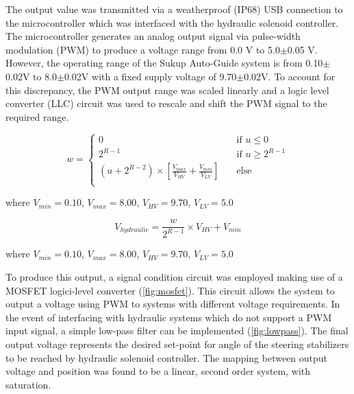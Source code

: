 \documentclass[authoryear]{elsarticle}
\begin{document}
The output value was transmitted via a weatherproof (IP68) USB
connection to the microcontroller which was interfaced with the
hydraulic solenoid controller. The microcontroller generates an analog
output signal via pulse-width modulation (PWM) to produce a voltage
range from 0.0 V to 5.0$\pm$0.05 V. However, the operating range of the
Sukup Auto-Guide system is from 0.10$\pm$0.02V to 8.0$\pm$0.02V with a fixed
supply voltage of 9.70$\pm$0.02V. To account for this discrepancy, the PWM
output range was scaled linearly and a logic level converter (LLC)
circuit was used to rescale and shift the PWM signal to the required
range.

\begin{equation}
  w = 
  \begin{cases}
    0 & \quad \text{if } u \leq 0 \\
    2^{R-1} & \quad \text{if } u \geq 2^{R-1}\\
    (u +2^{R-2})\times\left[\frac{V_{max}}{V_{HV}}+\frac{V_{min}}{V_{LV}}\right] & \quad \text{else} \\
  \end{cases}
  \label{eq:v_out}
\end{equation}
\begin{flushleft}
where $V_{min}=0.10$, $V_{max}=8.00$, $V_{HV}=9.70$, $V_{LV}=5.0$
\end{flushleft}

\begin{equation}
  V_{hydraulic} = \frac{w}{2^{R-1}} \times V_{HV} + V_{min}
  \label{eq:v_out}
\end{equation}
\begin{flushleft}
where $V_{min}=0.10$, $V_{max}=8.00$, $V_{HV}=9.70$, $V_{LV}=5.0$
\end{flushleft}

To produce this output, a signal condition circuit was employed making
use of a MOSFET logici-level converter (\ref{fig:mosfet}). This
circuit allows the system to output a voltage using PWM to systems with different voltage
requirements. In the event of interfacing with hydraulic systems which
do not support a PWM input signal, a simple low-pass filter can be
implemented (\ref{fig:lowpass}). The final output voltage represents the desired
set-point for angle of the steering stabilizers to be reached by
hydraulic solenoid controller. The mapping between output voltage and
position was found to be a linear, second order system, with
saturation.
\end{document}
